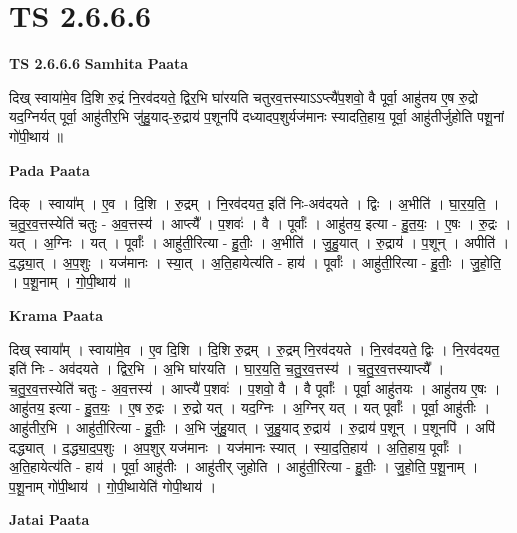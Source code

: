 \documentclass[17pt]{extarticle}
\begin{document}
\section{ TS 2.6.6.6 }

\textbf{TS 2.6.6.6 } \newline
\textbf{Samhita Paata} \newline

दिख् स्वाया॑मे॒व दि॒शि रु॒द्रं नि॒रव॑दयते॒ द्विर॒भि घा॑रयति चतुरव॒त्तस्याऽऽप्त्यै॑प॒शवो॒ वै पूर्वा॒ आहु॑तय ए॒ष रु॒द्रो यद॒ग्निर्यत् पूर्वा॒ आहु॑तीर॒भि जु॑हु॒याद्-रु॒द्राय॑ प॒शूनपि॑ दध्यादप॒शुर्यज॑मानः स्यादति॒हाय॒ पूर्वा॒ आहु॑तीर्जुहोति पशू॒नां गो॑पी॒थाय॑ ॥ \newline

\textbf{Pada Paata} \newline

दिक् । स्वाया᳚म् । ए॒व । दि॒शि । रु॒द्रम् । नि॒रव॑दयत॒ इति॑ निः-अव॑दयते । द्विः । अ॒भीति॑ । घा॒र॒य॒ति॒ । च॒तु॒र॒व॒त्तस्येति॑ चतुः - अ॒व॒त्तस्य॑ । आप्त्यै᳚ । प॒शवः॑ । वै । पूर्वाः᳚ । आहु॑तय॒ इत्या - हु॒त॒यः॒ । ए॒षः । रु॒द्रः । यत् । अ॒ग्निः । यत् । पूर्वाः᳚ । आहु॑ती॒रित्या - हु॒तीः॒ । अ॒भीति॑ । जु॒हु॒यात् । रु॒द्राय॑ । प॒शून् । अपीति॑ । द॒द्ध्या॒त् । अ॒प॒शुः । यज॑मानः । स्या॒त् । अ॒ति॒हायेत्य॑ति - हाय॑ । पूर्वाः᳚ । आहु॑ती॒रित्या - हु॒तीः॒ । जु॒हो॒ति॒ । प॒शू॒नाम् । गो॒पी॒थाय॑ ॥  \newline


\textbf{Krama Paata} \newline

दिख् स्वाया᳚म् । स्वाया॑मे॒व । ए॒व दि॒शि । दि॒शि रु॒द्रम् । रु॒द्रम् नि॒रव॑दयते । नि॒रव॑दयते॒ द्विः । नि॒रव॑दयत॒ इति॑ निः - अव॑दयते । द्विर॒भि । अ॒भि घा॑रयति । घा॒र॒य॒ति॒ च॒तु॒र॒व॒त्तस्य॑ । च॒तु॒र॒व॒त्तस्याप्त्यै᳚ । च॒तु॒र॒व॒त्तस्येति॑ चतुः - अ॒व॒त्तस्य॑ । आप्त्यै॑ प॒शवः॑ । प॒शवो॒ वै । वै पूर्वाः᳚ । पूर्वा॒ आहु॑तयः । आहु॑तय ए॒षः । आहु॑तय॒ इत्या - हु॒त॒यः॒ । ए॒ष रु॒द्रः । रु॒द्रो यत् । यद॒ग्निः । अ॒ग्निर् यत् । यत् पूर्वाः᳚ । पूर्वा॒ आहु॑तीः । आहु॑तीर॒भि । आहु॑ती॒रित्या - हु॒तीः॒ । अ॒भि जु॑हु॒यात् । जु॒हु॒याद् रु॒द्राय॑ । रु॒द्राय॑ प॒शून् । प॒शूनपि॑ । अपि॑ दद्ध्यात् । द॒द्ध्या॒द॒प॒शुः । अ॒प॒शुर् यज॑मानः । यज॑मानः स्यात् । स्या॒द॒ति॒हाय॑ । अ॒ति॒हाय॒ पूर्वाः᳚ । अ॒ति॒हायेत्य॑ति - हाय॑ । पूर्वा॒ आहु॑तीः । आहु॑तीर् जुहोति । आहु॑ती॒रित्या - हु॒तीः॒ । जु॒हो॒ति॒ प॒शू॒नाम् । प॒शू॒नाम् गो॑पी॒थाय॑ । गो॒पी॒थायेति॑ गोपी॒थाय॑ । \newline

\textbf{Jatai Paata} \newline
\end{document}
